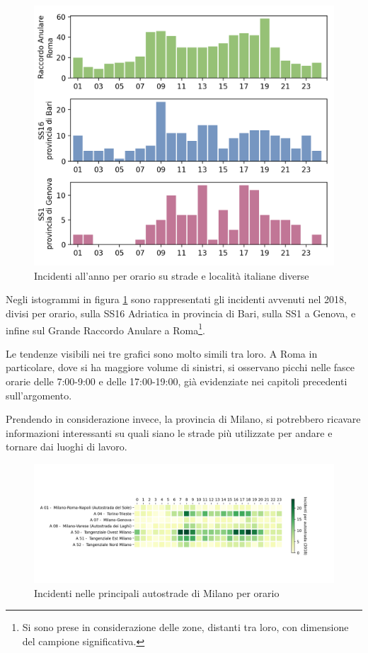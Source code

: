 \documentclass[a4paper,12pt]{report}
\begin{document}
\begin{figure}
    \includegraphics[width=\linewidth]{../src/incidenti/incidenti_aci/orari/orari.png}
    \caption{Incidenti all'anno per orario su strade e località italiane diverse}
    \label{fig:orari-strade-aci}
\end{figure}

Negli istogrammi in figura \ref{fig:orari-strade-aci} sono rappresentati 
gli incidenti avvenuti 
nel 2018, divisi per orario, sulla SS16 Adriatica in provincia di Bari, sulla SS1 
a Genova, e infine sul Grande Raccordo Anulare a 
Roma\footnote{Si sono prese in considerazione delle zone, distanti tra loro, 
con dimensione del campione significativa.}. 

Le tendenze visibili nei tre grafici sono molto simili tra loro. 
A Roma in particolare, dove si ha maggiore 
volume di sinistri, si osservano picchi nelle fasce orarie delle 
7:00-9:00 e delle 17:00-19:00, già evidenziate nei capitoli precedenti sull'argomento. 

Prendendo in considerazione invece, la provincia di Milano, si potrebbero ricavare 
informazioni interessanti su quali siano le strade più utilizzate per 
andare e tornare dai luoghi di lavoro. 

\begin{figure}
    \includegraphics[width=\linewidth]{../src/incidenti/incidenti_aci/orari/tangenziali_autostrade.png}
    \caption{Incidenti nelle principali autostrade di Milano per orario}
    \label{fig:tangenziali-autostrade}
\end{figure}
\end{document}
